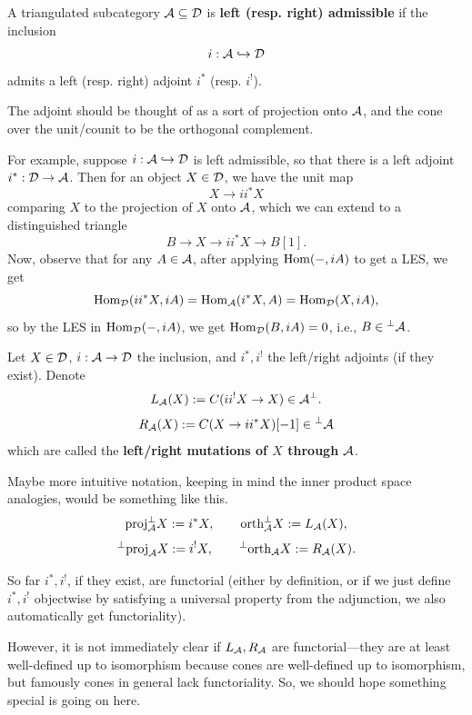 \documentclass[12pt]{article}
\begin{document}
\begin{defn}
    A triangulated subcategory $\mathcal{A} \subseteq \mathcal{D}$ is \textbf{left (resp. right) admissible} if the inclusion
    \[i: \mathcal{A} \hookrightarrow \mathcal{D}\]
    admits a left (resp. right) adjoint $i^*$ (resp. $i^!$).
\end{defn}

The adjoint should be thought of as a sort of projection onto $\mathcal{A}$, and the cone over the unit/counit to be the orthogonal complement.

For example, suppose $i: \mathcal{A}\hookrightarrow \mathcal{D}$ is left admissible, so that there is a left adjoint $i^*: \mathcal{D}\to \mathcal{A}$. Then for an object $X\in \mathcal{D}$, we have the unit map
\[X \to i i^* X\]
comparing $X$ to the projection of $X$ onto $\mathcal{A}$, which we can extend to a distinguished triangle
\[B \to X \to i i^* X \to B[1].\]
Now, observe that for any $A\in \mathcal{A}$, after applying $\mathrm{Hom}(-, iA)$ to get a LES, we get
\[\mathrm{Hom}_{\mathcal{D}}(i i^* X, i A) = \mathrm{Hom}_{\mathcal{A}}(i^* X, A) = \mathrm{Hom}_{\mathcal{D}}(X, i A),\]
so by the LES in $\mathrm{Hom}_{\mathcal{D}}(-,iA)$, we get $\mathrm{Hom}_{\mathcal{D}}(B, iA) = 0$, i.e., $B\in {}^\perp\mathcal{A}$.

\begin{defn}
    Let $X\in \mathcal{D}$, $i:\mathcal{A} \to \mathcal{D}$ the inclusion, and $i^*,i^!$ the left/right adjoints (if they exist). Denote
    \[L_{\mathcal{A}}(X) := C(ii^! X \to X) \in \mathcal{A}^\perp.\]
    \[R_{\mathcal{A}}(X) := C(X \to i i^* X)[-1] \in {}^\perp\mathcal{A}\]
    which are called the \textbf{left/right mutations of $X$ through $\mathcal{A}$}.
\end{defn}

Maybe more intuitive notation, keeping in mind the inner product space analogies, would be something like this.
\[\mathrm{proj}^\perp_{\mathcal{A}} X := i^* X, \qquad \mathrm{orth}^\perp_{\mathcal{A}} X := L_{\mathcal{A}}(X),\]
\[{}^\perp\mathrm{proj}_{\mathcal{A}} X := i^! X, \qquad {}^\perp\mathrm{orth}_{\mathcal{A}} X := R_{\mathcal{A}}(X).\]

So far $i^*,i^!$, if they exist, are functorial (either by definition, or if we just define $i^*,i^!$ objectwise by satisfying a universal property from the adjunction, we also automatically get functoriality).

However, it is not immediately clear if $L_{\mathcal{A}}, R_{\mathcal{A}}$ are functorial---they are at least well-defined up to isomorphism because cones are well-defined up to isomorphism, but famously cones in general lack functoriality. So, we should hope something special is going on here.
\end{document}
